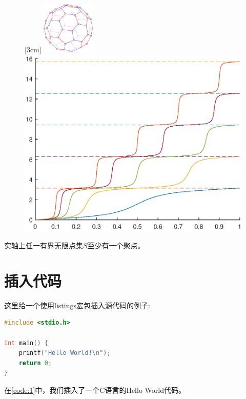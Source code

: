 \begin{figure}[htp]
	\centering
	[3cm] %
	{\includegraphics[height=2.5cm]{figure/example/m2.pdf}}
	\hspace{4em}
	{	\includegraphics[scale=0.5]{figure/example/purfer_left.eps}}
	\label{fig4.}
\end{figure}
\begin{lemma}
	实轴上任一有界无限点集$S$至少有一个聚点。
\end{lemma}

\section{插入代码}

这里给一个使用listings宏包插入源代码的例子:
\begin{lstlisting}[language={C}, caption={一段C源代码}, label=code:1]
#include <stdio.h>

int main() {
    printf("Hello World!\n");
    return 0;
}
\end{lstlisting}
在\autoref{code:1}中，我们插入了一个C语言的Hello World代码。
